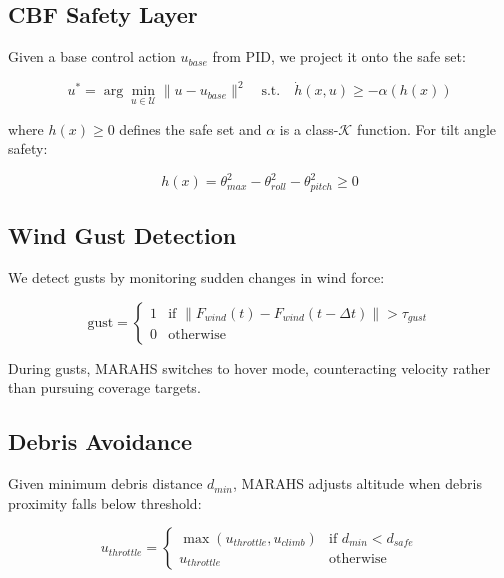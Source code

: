 \documentclass[10pt,twocolumn]{article}
\begin{document}
\subsection{CBF Safety Layer}

Given a base control action $u_{base}$ from PID, we project it onto the safe set:

\begin{equation}
    u^* = \arg\min_{u \in \mathcal{U}} \|u - u_{base}\|^2 \quad \text{s.t.} \quad \dot{h}(x, u) \geq -\alpha(h(x))
\end{equation}

where $h(x) \geq 0$ defines the safe set and $\alpha$ is a class-$\mathcal{K}$ function. For tilt angle safety:

\begin{equation}
    h(x) = \theta_{max}^2 - \theta_{roll}^2 - \theta_{pitch}^2 \geq 0
\end{equation}

\subsection{Wind Gust Detection}

We detect gusts by monitoring sudden changes in wind force:

\begin{equation}
    \text{gust} = \begin{cases} 
    1 & \text{if } \|F_{wind}(t) - F_{wind}(t-\Delta t)\| > \tau_{gust} \\
    0 & \text{otherwise}
    \end{cases}
\end{equation}

During gusts, MARAHS switches to hover mode, counteracting velocity rather than pursuing coverage targets.

\subsection{Debris Avoidance}

Given minimum debris distance $d_{min}$, MARAHS adjusts altitude when debris proximity falls below threshold:

\begin{equation}
    u_{throttle} = \begin{cases}
    \max(u_{throttle}, u_{climb}) & \text{if } d_{min} < d_{safe} \\
    u_{throttle} & \text{otherwise}
    \end{cases}
\end{equation}
\end{document}
